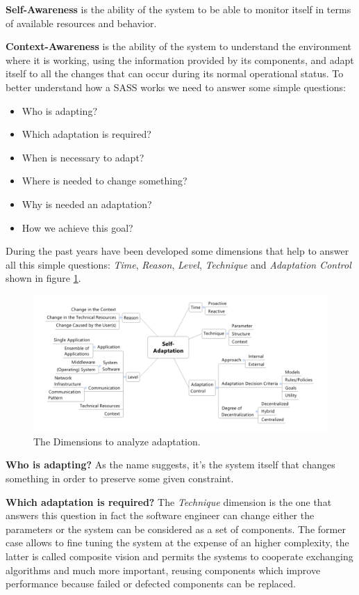 \textbf{Self-Awareness} is the ability of the system to be able to monitor itself in terms of available resources and behavior.

\textbf{Context-Awareness} is the ability of the system to understand the environment where it is working, using the information provided by its components, and adapt itself to all the changes that can occur during its normal operational status.
To better understand how a SASS works we need to answer some simple questions:
\begin{itemize}
	\item Who is adapting?
	\item Which adaptation is required?
	\item When is necessary to adapt?
	\item Where is needed to change something?
	\item Why is needed an adaptation?
	\item How we achieve this goal?
\end{itemize}

During the past years have been developed some dimensions that help to answer all this simple questions: \emph{Time}, \emph{Reason}, \emph{Level}, \emph{Technique} and \emph{Adaptation Control} shown in figure \ref{fig:dimensions}.
\begin{figure}[h]
	\centerline
	{\includegraphics[scale=0.50]{img/dimensions.png}}
	\caption[The Dimensions]{The Dimensions to analyze adaptation.\cite{eng-appr-sas}}
	\label{fig:dimensions}
\end{figure}

\textbf{Who is adapting?} As the name suggests, it's the system itself that changes something in order to preserve some given constraint.

\textbf{Which adaptation is required?} The \emph{Technique} dimension is the one that answers this question in fact the software engineer can change either the parameters or the system can be considered as a set of components. The former case allows to fine tuning the system at the expense of an higher complexity, the latter is called composite vision and permits the systems to cooperate exchanging algorithms and much more important, reusing components which improve performance because failed or defected components can be replaced.

